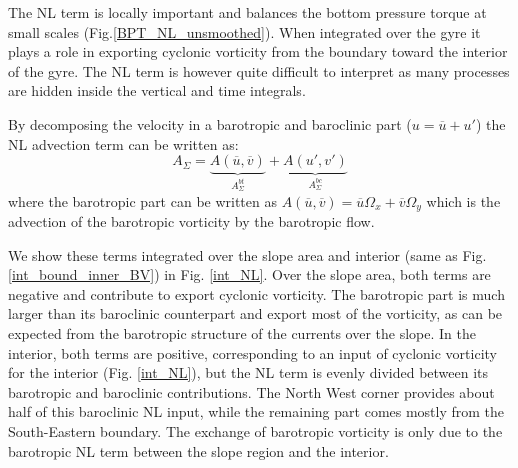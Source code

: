 \documentclass{ametsoc}
\begin{document}
The NL term is locally important and balances the bottom pressure torque at small scales (Fig.\ref{BPT_NL_unsmoothed}). When integrated over the gyre it plays a role in exporting cyclonic vorticity from the boundary toward the interior of the gyre. The NL term is however quite difficult to interpret as  many processes are hidden inside the vertical and time integrals. 

By decomposing the velocity in a barotropic and baroclinic part ($u = \overline{u} + u'$) the NL advection term can be written as:
$$A_{\Sigma}=\underbrace{A(\overline{u},\overline{v})}_{A^{bt}_{\Sigma}}+\underbrace{A(u',v')}_{A^{bc}_{\Sigma}}$$
where the barotropic part can be written as $A(\overline{u},\overline{v})= \overline{u}\Omega _x +\overline{v}\Omega _y$ which is the advection of the barotropic vorticity by the barotropic flow.  

We show these terms integrated over the slope area and interior (same as Fig.\ref{int_bound_inner_BV}) in Fig. \ref{int_NL}. Over the slope area, both terms are negative and contribute to export cyclonic vorticity. The barotropic part is much larger than its baroclinic counterpart and export most of the vorticity, as can be expected from the barotropic structure of the currents over the slope. In the interior, both terms are positive, corresponding to an input of cyclonic vorticity for the interior (Fig. \ref{int_NL}), but the NL term is evenly divided between its barotropic and baroclinic contributions. The North West corner provides about half of this baroclinic NL input, while the remaining part comes mostly from the South-Eastern boundary. The exchange of barotropic vorticity is only due to the barotropic NL term between the slope region and the interior. 
\end{document}
